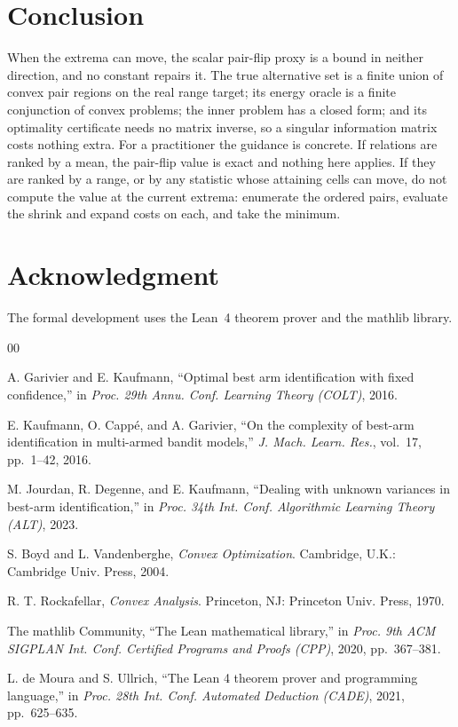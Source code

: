 \section{Conclusion}

When the extrema can move, the scalar pair-flip proxy is a bound in neither direction, and no
constant repairs it. The true alternative set is a finite union of convex pair regions on the
real range target; its energy oracle is a finite conjunction of convex problems; the inner
problem has a closed form; and its optimality certificate needs no matrix inverse, so a
singular information matrix costs nothing extra. For a practitioner the guidance is concrete.
If relations are ranked by a mean, the pair-flip value is exact and nothing here applies. If
they are ranked by a range, or by any statistic whose attaining cells can move, do not compute
the value at the current extrema: enumerate the ordered pairs, evaluate the shrink and expand
costs on each, and take the minimum.

\section*{Acknowledgment}

The formal development uses the Lean~4 theorem prover and the mathlib library.

\begin{thebibliography}{00}

 A. Garivier and E. Kaufmann, ``Optimal best arm identification with
fixed confidence,'' in \emph{Proc. 29th Annu. Conf. Learning Theory (COLT)}, 2016.

 E. Kaufmann, O. Capp\'e, and A. Garivier, ``On the complexity of
best-arm identification in multi-armed bandit models,'' \emph{J. Mach. Learn. Res.},
vol.~17, pp.~1--42, 2016.

 M. Jourdan, R. Degenne, and E. Kaufmann, ``Dealing with unknown
variances in best-arm identification,'' in \emph{Proc. 34th Int. Conf. Algorithmic Learning
Theory (ALT)}, 2023.

 S. Boyd and L. Vandenberghe, \emph{Convex Optimization}. Cambridge,
U.K.: Cambridge Univ. Press, 2004.

 R. T. Rockafellar, \emph{Convex Analysis}. Princeton, NJ:
Princeton Univ. Press, 1970.

 The mathlib Community, ``The Lean mathematical library,'' in
\emph{Proc. 9th ACM SIGPLAN Int. Conf. Certified Programs and Proofs (CPP)}, 2020,
pp.~367--381.

 L. de Moura and S. Ullrich, ``The Lean 4 theorem prover and
programming language,'' in \emph{Proc. 28th Int. Conf. Automated Deduction (CADE)}, 2021,
pp.~625--635.

\end{thebibliography}




